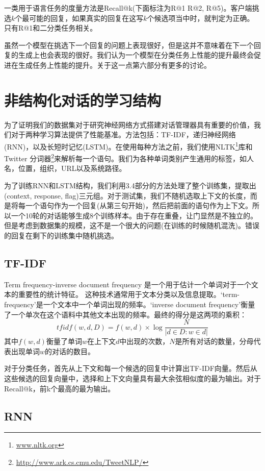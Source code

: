 \documentclass{article}
\begin{document}
\begin{multicols}{2}
		一类用于语言任务的度量方法是Recall@k(下面标注为R@1 R@2, R@5)。客户端挑选$k$个最可能的回复，如果真实的回复在这写$k$个候选项当中时，就判定为正确。只有R@1和二分类任务相关。
		
		虽然一个模型在挑选下一个回复的问题上表现很好，但是这并不意味着在下一个回复的生成上也会表现的很好。我们认为一个模型在分类任务上性能的提升最终会促进在生成任务上性能的提升。关于这一点第六部分有更多的讨论。
		
	\section{非结构化对话的学习结构}
	
	为了证明我们的数据集对于研究神经网络方式搭建对话管理器具有重要的价值，我们对于两种学习算法提供了性能基准。方法包括：TF-IDF，递归神经网络(RNN)，以及长短时记忆(LSTM)。在使用每种方法之前，我们使用NLTK\footnote{\href{www.nltk.org}{www.nltk.org}}库和Twitter 分词器\footnote{\href{http://www.ark.cs.cmu.edu/TweetNLP/}{http://www.ark.cs.cmu.edu/TweetNLP/}}来解析每一个语句。我们为各种单词类别产生通用的标签，如人名，位置，组织，URL以及系统路径。
	
	为了训练RNN和LSTM结构，我们利用3.4部分的方法处理了整个训练集，提取出(context, response, flag)三元组。对于测试集，我们不随机选取上下文的长度，而是将每一个语句作为一个回复(从第三句开始)，然后把前面的语句作为上下文。所以一个10轮的对话能够生成8个训练样本。由于存在重叠，让门显然是不独立的。但是考虑到数据集的规模，这不是一个很大的问题(在训练的时候随机混洗)。错误的回复在剩下的训练集中随机挑选。
	
		\subsection{TF-IDF}
		Term frequency-inverse document frequency 是一个用于估计一个单词对于一个文本的重要性的统计特征。
		这种技术通常用于文本分类以及信息提取。‘term-frequency’是一个文本中一个单词出现的频率。‘inverse document frequency’衡量了一个单次在这个语料中其他文本出现的频率。最终的得分是这两项的乘积：
		$$tfidf(w,d,D) = f(w,d) \times \log \frac{N}{|d \in D:w \in d|}$$
		其中$f(w,d)$衡量了单词$w$在上下文$d$中出现的次数，$N$是所有对话的数量，分母代表出现单词$w$的对话的数目。
		
		对于分类任务，首先从上下文和每一个候选的回复中计算出TF-IDF向量。然后从这些候选的回复向量中，选择和上下文向量具有最大余弦相似度的最为输出。对于Recall@k，前k个最高的最为输出。
		
		\subsection{RNN}
		

\end{multicols}
\end{document}
